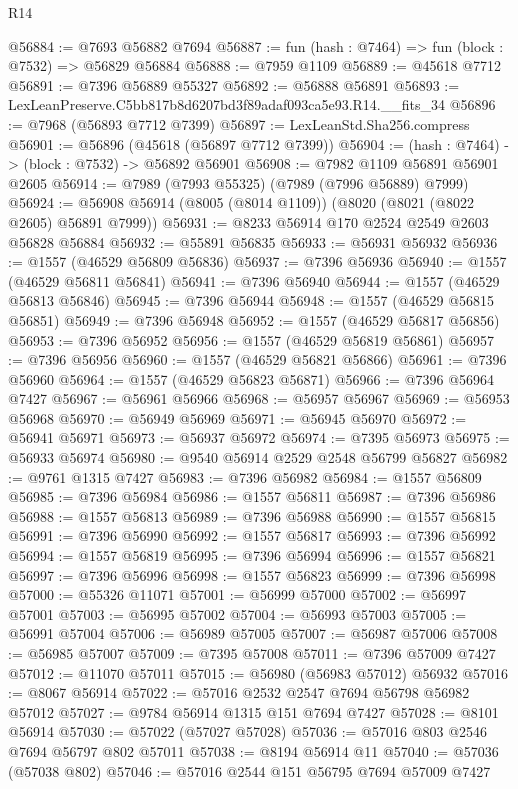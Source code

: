 \begin{lexlean}{R14}
\begin{coremodule}
@56884 := @7693 @56882 @7694
@56887 := fun (hash : @7464) => fun (block : @7532) => @56829 @56884
@56888 := @7959 @1109
@56889 := @45618 @7712
@56891 := @7396 @56889 @55327
@56892 := @56888 @56891
@56893 := LexLeanPreserve.C5bb817b8d6207bd3f89adaf093ca5e93.R14.__fits_34
@56896 := @7968 (@56893 @7712 @7399)
@56897 := LexLeanStd.Sha256.compress
@56901 := @56896 (@45618 (@56897 @7712 @7399))
@56904 := (hash : @7464) -> (block : @7532) -> @56892 @56901
@56908 := @7982 @1109 @56891 @56901 @2605
@56914 := @7989 (@7993 @55325) (@7989 (@7996 @56889) @7999)
@56924 := @56908 @56914 (@8005 (@8014 @1109)) (@8020 (@8021 (@8022 @2605) @56891 @7999))
@56931 := @8233 @56914 @170 @2524 @2549 @2603 @56828 @56884
@56932 := @55891 @56835
@56933 := @56931 @56932
@56936 := @1557 (@46529 @56809 @56836)
@56937 := @7396 @56936
@56940 := @1557 (@46529 @56811 @56841)
@56941 := @7396 @56940
@56944 := @1557 (@46529 @56813 @56846)
@56945 := @7396 @56944
@56948 := @1557 (@46529 @56815 @56851)
@56949 := @7396 @56948
@56952 := @1557 (@46529 @56817 @56856)
@56953 := @7396 @56952
@56956 := @1557 (@46529 @56819 @56861)
@56957 := @7396 @56956
@56960 := @1557 (@46529 @56821 @56866)
@56961 := @7396 @56960
@56964 := @1557 (@46529 @56823 @56871)
@56966 := @7396 @56964 @7427
@56967 := @56961 @56966
@56968 := @56957 @56967
@56969 := @56953 @56968
@56970 := @56949 @56969
@56971 := @56945 @56970
@56972 := @56941 @56971
@56973 := @56937 @56972
@56974 := @7395 @56973
@56975 := @56933 @56974
@56980 := @9540 @56914 @2529 @2548 @56799 @56827
@56982 := @9761 @1315 @7427
@56983 := @7396 @56982
@56984 := @1557 @56809
@56985 := @7396 @56984
@56986 := @1557 @56811
@56987 := @7396 @56986
@56988 := @1557 @56813
@56989 := @7396 @56988
@56990 := @1557 @56815
@56991 := @7396 @56990
@56992 := @1557 @56817
@56993 := @7396 @56992
@56994 := @1557 @56819
@56995 := @7396 @56994
@56996 := @1557 @56821
@56997 := @7396 @56996
@56998 := @1557 @56823
@56999 := @7396 @56998
@57000 := @55326 @11071
@57001 := @56999 @57000
@57002 := @56997 @57001
@57003 := @56995 @57002
@57004 := @56993 @57003
@57005 := @56991 @57004
@57006 := @56989 @57005
@57007 := @56987 @57006
@57008 := @56985 @57007
@57009 := @7395 @57008
@57011 := @7396 @57009 @7427
@57012 := @11070 @57011
@57015 := @56980 (@56983 @57012) @56932
@57016 := @8067 @56914
@57022 := @57016 @2532 @2547 @7694 @56798 @56982 @57012
@57027 := @9784 @56914 @1315 @151 @7694 @7427
@57028 := @8101 @56914
@57030 := @57022 (@57027 @57028)
@57036 := @57016 @803 @2546 @7694 @56797 @802 @57011
@57038 := @8194 @56914 @11
@57040 := @57036 (@57038 @802)
@57046 := @57016 @2544 @151 @56795 @7694 @57009 @7427

\end{coremodule}
\end{lexlean}
